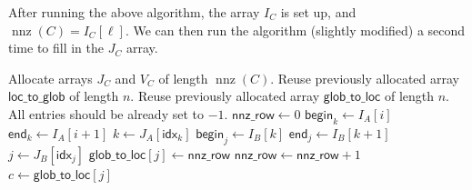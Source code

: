 \documentclass[12pt]{article}
\DeclareMathOperator{\nnz}{nnz}
\begin{document}
After running the above algorithm, the array $I_C$ is set up, and $\nnz(C) = I_C[\ell]$.
We can then run the algorithm (slightly modified) a second time to fill in the $J_C$ array.
\begin{algorithm}[H]
   \caption{Given $I_C$, fill in $J_C$.}
   \begin{algorithmic}
      \State Allocate arrays $J_C$ and $V_C$ of length $\nnz(C)$.
      \State Reuse previously allocated array $\textsf{loc\_to\_glob}$ of length $n$.
      \State Reuse previously allocated array $\textsf{glob\_to\_loc}$ of length $n$. All entries should be already set to $-1$.
         \State $\textsf{nnz\_row} \gets 0$
         \State $\textsf{begin}_k \gets I_A[i]$
         \State $\textsf{end}_k \gets I_A[i+1]$
            \State $k \gets J_A[\textsf{idx}_k]$ 
%
            \State $\textsf{begin}_j \gets I_B[k]$
            \State $\textsf{end}_j \gets I_B[k+1]$
%
               \State $j \gets J_B[\textsf{idx}_j]$
                  \State $\textsf{glob\_to\_loc}[j] \gets \textsf{nnz\_row}$
                  \State $\textsf{nnz\_row} \gets \textsf{nnz\_row} + 1$
               \Else
                    \State $c \gets \textsf{glob\_to\_loc}[j]$
               \EndIf
            \EndFor
         \EndFor
      \EndFor
   \end{algorithmic}
\end{algorithm}
\end{document}
